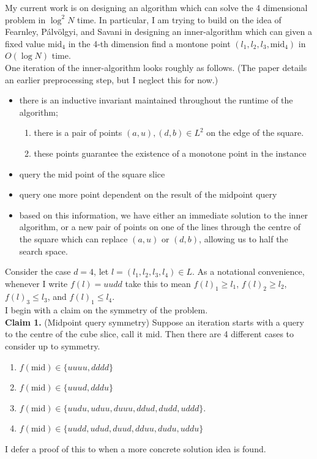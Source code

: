 \documentclass{article}
\newcommand{\mi}{\text{mid}}
\newcommand{\pav}{Pálvölgyi}
\begin{document}
  My current work is on designing an algorithm which can solve the 4 dimensional problem in $\log^2 N$ time.
  In particular, I am trying to build on the idea of Fearnley, \pav, and Savani in designing an inner-algorithm
  which can given a fixed value $\mi_4$ in the 4-th dimension find a montone point 
  $(l_1, l_2, l_3, \mi_4)$ in $O(\log N)$ time. \\

  One iteration of the inner-algorithm looks roughly as follows. (The paper details an earlier preprocessing step,
  but I neglect this for now.)
  \begin{itemize}
    \item there is an inductive invariant maintained throughout the runtime of the algorithm;
      \begin{enumerate}
        \item there is a pair of points $(a, u), (d, b) \in L^2$ on the edge of the square.
        \item these points guarantee the existence of a monotone point in the instance
      \end{enumerate}
    \item query the mid point of the square slice
    \item query one more point dependent on the result of the midpoint query
    \item based on this information, we have either an immediate solution to the
      inner algorithm, or a new pair of points on one of the lines through
      the centre of the square which can replace $(a, u)$ or $(d, b)$, allowing
      us to half the search space.
  \end{itemize}



  Consider the case $d=4$, let $l = (l_1, l_2, l_3, l_4) \in L$. 
  As a notational convenience, whenever I write $f(l) = uudd$ take
  this to mean $f(l)_1 \geq l_1$, $f(l)_2 \geq l_2$, $f(l)_3 \leq l_3$, and $f(l)_1 \leq l_4$.  \\

  I begin with a claim on the symmetry of the problem. \\

  \textbf{Claim 1.} (Midpoint query symmetry) Suppose an iteration starts with a query to the centre of the
  cube slice, call it $\mi$. Then there are 4 different cases to consider up to symmetry.
  \begin{enumerate}
    \item $f(\mi) \in \{ uuuu, dddd \}$
    \item $f(\mi) \in \{ uuud, dddu \}$
    \item $f(\mi) \in \{ uudu, uduu, duuu, ddud, dudd, uddd \}$.
    \item $f(\mi) \in \{ uudd, udud, duud, dduu, dudu, uddu \}$
  \end{enumerate}
  I defer a proof of this to when a more concrete solution idea is found. \\
\end{document}
